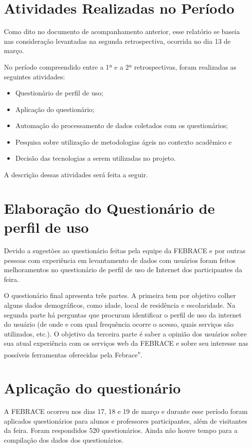 \documentclass[a4paper,12pt,font=plain,header=plain]{abnt}
\begin{document}
  \section{Atividades Realizadas no Período}
    Como dito no documento de acompanhamento anterior, esse relatório se baseia nas consideração levantadas na segunda retrospectiva, ocorrida no dia 13 de março.

    No período compreendido entre a 1ª e a 2ª retrospectivas, foram realizadas as seguintes atividades:
    \begin{itemize}
      \item
        Questionário de perfil de uso;
      \item
        Aplicação do questionário;
      \item
        Automação do processamento de dados coletados com os questionários;
      \item
        Pesquisa sobre utilização de metodologias ágeis no contexto acadêmico e
      \item
        Decisão das tecnologias a serem utilizadas no projeto.
    \end{itemize}

    A descrição dessas atividades será feita a seguir.

  \section{Elaboração do Questionário de perfil de uso}
    Devido a sugestões ao questionário feitas pela equipe da FEBRACE e por outras pessoas com experiência em levantamento de dados com usuários foram feitos melhoramentos no questionário de perfil de uso de Internet dos participantes da feira.

    O questionário final apresenta três partes. A primeira tem por objetivo colher alguns dados demográficos, como idade, local de residência e escolaridade. Na segunda parte há perguntas que procuram identificar o perfil de uso da internet do usuário (de onde e com qual frequência ocorre o acesso, quais serviços são utilizados, etc.). O objetivo da terceira parte é saber a opinião dos usuários sobre sua atual experiência com os serviços web da FEBRACE e sobre seu interesse nas possíveis ferramentas oferecidas pela Febrace\textsuperscript{v}.

  \section{Aplicação do questionário}
    A FEBRACE ocorreu nos dias 17, 18 e 19 de março e durante esse período foram aplicados questionários para alunos e professores participantes, além de visitantes da feira. Foram respondidos 520 questionários. Ainda não houve tempo para a compilação dos dados dos questionários.
\end{document}
